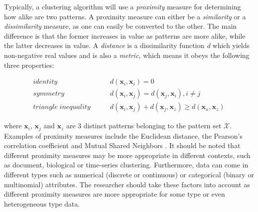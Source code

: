 Typically, a clustering algorithm will use a \emph{proximity} measure for determining how alike are two patterns.
A proximity measure can either be a \emph{similarity} or a \emph{dissimilarity} measure, as one can easily be converted to the other.
The main difference is that the former increases in value as patterns are more alike, while the latter decreases in value.
A \emph{distance} is a dissimilarity function \emph{d} which yields non-negative real values and is also a \emph{metric}, which means it obeys the following three properties:



\begin{align*} 
    identity \qquad & d(\mathbf{x}_i, \mathbf{x}_i) = 0  \\
    symmetry \qquad & d(\mathbf{x}_i, \mathbf{x}_j) = d(\mathbf{x}_j, \mathbf{x}_i), i \neq j \\ 
    triangle \; inequality \qquad & d(\mathbf{x}_i, \mathbf{x}_j) + d(\mathbf{x}_j, \mathbf{x}_z)  \ge d(\mathbf{x}_x, \mathbf{x}_z)
\end{align*}




where $\mathbf{x}_i$, $\mathbf{x}_j$ and $\mathbf{x}_z$ are 3 distinct patterns belonging to the pattern set $\mathcal{X}$.
Examples of proximity measures include the Euclidean distance, the Pearson’s correlation coefficient and Mutual Shared Neighbors \cite{jarvis1973clustering}.
It should be noted that different proximity measures may be more appropriate in different contexts, such as document, biological or time-series clustering.
Furthermore, data can come in different types such as numerical (discrete or continuous) or categorical (binary or multinomial) attributes.
The researcher should take these factors into account as different proximity measures are more appropriate for some type or even heterogeneous type data. 

